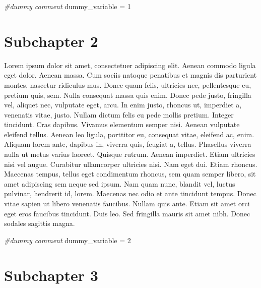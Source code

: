 \documentclass[]{book}
\newenvironment{Shaded}{\begin{snugshade}}{\end{snugshade}}
\newcommand{\DecValTok}[1]{\textcolor[rgb]{0.00,0.00,0.81}{#1}}
\newcommand{\StringTok}[1]{\textcolor[rgb]{0.31,0.60,0.02}{#1}}
\newcommand{\CommentTok}[1]{\textcolor[rgb]{0.56,0.35,0.01}{\textit{#1}}}
\newcommand{\NormalTok}[1]{#1}
\begin{document}
\begin{Shaded}
\begin{Highlighting}[]
\CommentTok{#dummy comment}
\NormalTok{dummy_variable =}\StringTok{ }\DecValTok{1}
\end{Highlighting}
\end{Shaded}

\section{Subchapter 2}\label{subchapter-2}

Lorem ipsum dolor sit amet, consectetuer adipiscing elit. Aenean commodo
ligula eget dolor. Aenean massa. Cum sociis natoque penatibus et magnis
dis parturient montes, nascetur ridiculus mus. Donec quam felis,
ultricies nec, pellentesque eu, pretium quis, sem. Nulla consequat massa
quis enim. Donec pede justo, fringilla vel, aliquet nec, vulputate eget,
arcu. In enim justo, rhoncus ut, imperdiet a, venenatis vitae, justo.
Nullam dictum felis eu pede mollis pretium. Integer tincidunt. Cras
dapibus. Vivamus elementum semper nisi. Aenean vulputate eleifend
tellus. Aenean leo ligula, porttitor eu, consequat vitae, eleifend ac,
enim. Aliquam lorem ante, dapibus in, viverra quis, feugiat a, tellus.
Phasellus viverra nulla ut metus varius laoreet. Quisque rutrum. Aenean
imperdiet. Etiam ultricies nisi vel augue. Curabitur ullamcorper
ultricies nisi. Nam eget dui. Etiam rhoncus. Maecenas tempus, tellus
eget condimentum rhoncus, sem quam semper libero, sit amet adipiscing
sem neque sed ipsum. Nam quam nunc, blandit vel, luctus pulvinar,
hendrerit id, lorem. Maecenas nec odio et ante tincidunt tempus. Donec
vitae sapien ut libero venenatis faucibus. Nullam quis ante. Etiam sit
amet orci eget eros faucibus tincidunt. Duis leo. Sed fringilla mauris
sit amet nibh. Donec sodales sagittis magna.

\begin{Shaded}
\begin{Highlighting}[]
\CommentTok{#dummy comment }
\NormalTok{dummy_variable =}\StringTok{ }\DecValTok{2}
\end{Highlighting}
\end{Shaded}

\section{Subchapter 3}\label{subchapter-3}
\end{document}
